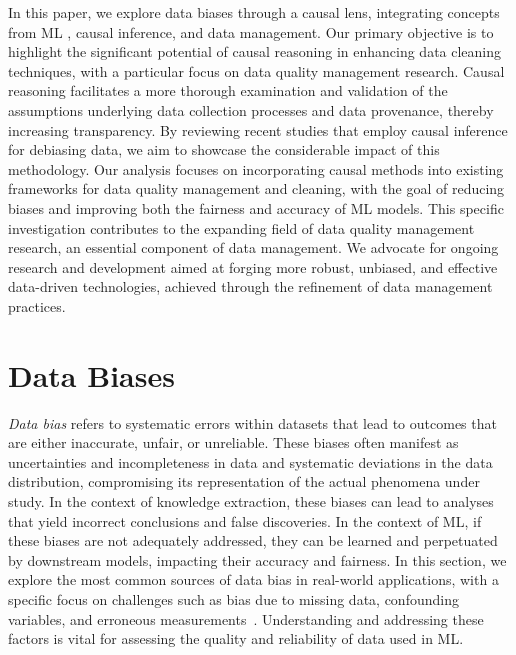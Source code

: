 \documentclass[11pt]{article}
\begin{document}
In this paper, we explore data biases through a causal lens, integrating concepts from  ML , causal inference, and data management. Our primary objective is to highlight the significant potential of causal reasoning in enhancing data cleaning techniques, with a particular focus on data quality management research. Causal reasoning facilitates a more thorough examination and validation of the assumptions underlying data collection processes and data provenance, thereby increasing transparency. By reviewing recent studies that employ causal inference for debiasing data, we aim to showcase the considerable impact of this methodology. Our analysis focuses on incorporating causal methods into existing frameworks for data quality management and cleaning, with the goal of reducing biases and improving both the fairness and accuracy of ML models. This specific investigation contributes to the expanding field of data quality management research, an essential component of data management. We advocate for ongoing research and development aimed at forging more robust, unbiased, and effective data-driven technologies, achieved through the refinement of data management practices.




\vspace{-.4cm}
\section{Data Biases}
\vspace{-.2cm}

{\em Data bias} refers to systematic errors within datasets that lead to outcomes that are either inaccurate, unfair, or unreliable. These biases often manifest as uncertainties and incompleteness in data and systematic deviations in the data distribution, compromising its representation of the actual phenomena under study. In the context of knowledge extraction, these biases can lead to analyses that yield incorrect conclusions and false discoveries. In the context of ML, if these biases are not adequately addressed, they can be learned and perpetuated by downstream models, impacting their accuracy and fairness. In this section, we explore the most common sources of data bias in real-world applications, with a specific focus on challenges such as bias due to missing data, confounding variables, and erroneous measurements~\cite{zhioua2023dissecting,goel2021importance,bareinboim2012controlling,pearl2012measurement,mehrabi2021survey}. Understanding and addressing these factors is vital for assessing the quality and reliability of data used in ML.
\end{document}
